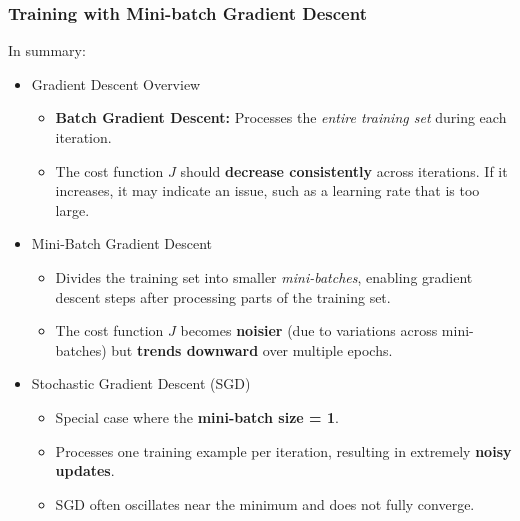 \documentclass[letterpaper,12pt,notitlepage,twoside]{report}
\begin{document}
\subsubsection{Training with Mini-batch Gradient Descent}
In summary:
\begin{itemize}[nosep]
\item Gradient Descent Overview
\begin{itemize}
    \item \textbf{Batch Gradient Descent:} Processes the \textit{entire training set} during each iteration.
    \item The cost function \( J \) should \textbf{decrease consistently} across iterations. If it increases, it may indicate an issue, such as a learning rate that is too large.
\end{itemize}

\item Mini-Batch Gradient Descent
\begin{itemize}
    \item Divides the training set into smaller \textit{mini-batches}, enabling gradient descent steps after processing parts of the training set.
    \item The cost function \( J \) becomes \textbf{noisier} (due to variations across mini-batches) but \textbf{trends downward} over multiple epochs.
\end{itemize}

\item Stochastic Gradient Descent (SGD)
\begin{itemize}
    \item Special case where the \textbf{mini-batch size = 1}.
    \item Processes one training example per iteration, resulting in extremely \textbf{noisy updates}.
    \item SGD often oscillates near the minimum and does not fully converge.
\end{itemize}
\end{itemize}
\end{document}
